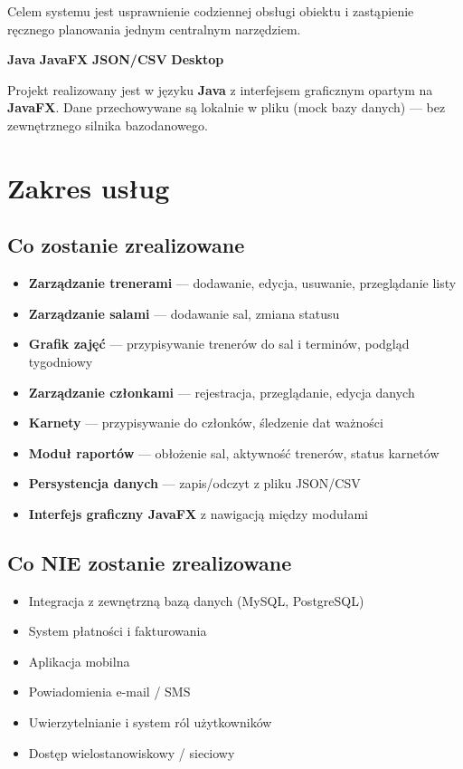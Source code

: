 \documentclass[11pt, a4paper]{article}
\newcommand{\tag}[2][accent]{%
  \colorbox{#1!15}{\small\color{#1!80!black}\textbf{#2}}%
}
\begin{document}
Celem systemu jest usprawnienie codziennej obsługi obiektu i zastąpienie ręcznego planowania
jednym centralnym narzędziem.

\medskip
\tag[secondary]{Java} \tag[secondary]{JavaFX} \tag[secondary]{JSON/CSV} \tag[secondary]{Desktop}

\bigskip
Projekt realizowany jest w języku \textbf{Java} z interfejsem graficznym opartym na
\textbf{JavaFX}. Dane przechowywane są lokalnie w pliku (mock bazy danych) — bez zewnętrznego
silnika bazodanowego.

\section{Zakres usług}

\subsection{Co zostanie zrealizowane}

\begin{itemize}[leftmargin=*, itemsep=2pt]
  \item \textbf{Zarządzanie trenerami} — dodawanie, edycja, usuwanie, przeglądanie listy
  \item \textbf{Zarządzanie salami} — dodawanie sal, zmiana statusu
  \item \textbf{Grafik zajęć} — przypisywanie trenerów do sal i terminów, podgląd tygodniowy
  \item \textbf{Zarządzanie członkami} — rejestracja, przeglądanie, edycja danych
  \item \textbf{Karnety} — przypisywanie do członków, śledzenie dat ważności
  \item \textbf{Moduł raportów} — obłożenie sal, aktywność trenerów, status karnetów
  \item \textbf{Persystencja danych} — zapis/odczyt z pliku JSON/CSV
  \item \textbf{Interfejs graficzny JavaFX} z nawigacją między modułami
\end{itemize}

\subsection{Co NIE zostanie zrealizowane}

\begin{itemize}[leftmargin=*, itemsep=2pt, label=\color{accent}$\times$]
  \item Integracja z zewnętrzną bazą danych (MySQL, PostgreSQL)
  \item System płatności i fakturowania
  \item Aplikacja mobilna
  \item Powiadomienia e-mail / SMS
  \item Uwierzytelnianie i system ról użytkowników
  \item Dostęp wielostanowiskowy / sieciowy
\end{itemize}
\end{document}
